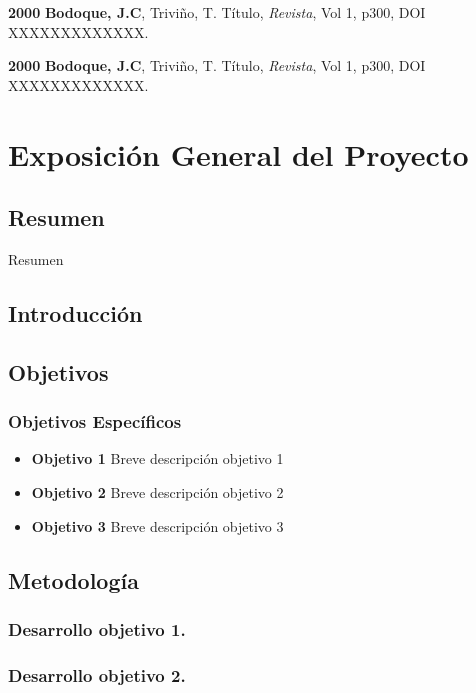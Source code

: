 \documentclass{proyectotesis}
\begin{document}
\begin{cvlist}{}
\item[\textbf{2000}] \textbf{Bodoque, J.C}, Triviño, T. Título, {\it Revista}, Vol 1, p300, DOI XXXXXXXXXXXXX.
\item[\textbf{2000}] \textbf{Bodoque, J.C}, Triviño, T. Título, {\it Revista}, Vol 1, p300, DOI XXXXXXXXXXXXX.

\end{cvlist}

\newpage

\section{Exposición General del Proyecto}
\subsection{Resumen}

Resumen

\subsection{Introducción}

\subsection{Objetivos}

\subsubsection*{Objetivos Específicos}
\begin{itemize}
\item    {\bf Objetivo 1} Breve descripción objetivo 1
\item    {\bf Objetivo 2} Breve descripción objetivo 2
\item    {\bf Objetivo 3} Breve descripción objetivo 3

\end{itemize}

\subsection{Metodología}
\subsubsection{Desarrollo objetivo 1.}
\subsubsection{Desarrollo objetivo 2.} 
\end{document}
